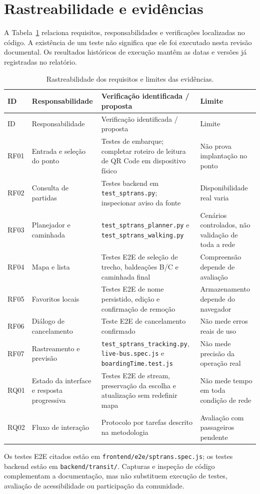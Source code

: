 \section{Rastreabilidade e evidências}
A Tabela~\ref{tab:rastreabilidade} relaciona requisitos, responsabilidades e verificações localizadas no código. A existência de um teste não significa que ele foi executado nesta revisão documental. Os resultados históricos de execução mantêm as datas e versões já registradas no relatório.
\begin{longtable}{p{1.2cm}p{3cm}p{5cm}p{3cm}}
\caption{Rastreabilidade dos requisitos e limites das evidências.}\label{tab:rastreabilidade}\\
\hline ID & Responsabilidade & Verificação identificada / proposta & Limite\\\hline\endfirsthead
\hline ID & Responsabilidade & Verificação identificada / proposta & Limite\\\hline\endhead
RF01 & Entrada e seleção do ponto & Testes de embarque; completar roteiro de leitura de QR Code em dispositivo físico & Não prova implantação no ponto\\
RF02 & Consulta de partidas & Testes backend em \nolinkurl{test_sptrans.py}; inspecionar aviso da fonte & Disponibilidade real varia\\
RF03 & Planejador e caminhada & \nolinkurl{test_sptrans_planner.py} e \nolinkurl{test_sptrans_walking.py} & Cenários controlados, não validação de toda a rede\\
RF04 & Mapa e lista & Testes E2E de seleção de trecho, baldeações B/C e caminhada final & Compreensão depende de avaliação\\
RF05 & Favoritos locais & Testes E2E de nome persistido, edição e confirmação de remoção & Armazenamento depende do navegador\\
RF06 & Diálogo de cancelamento & Teste E2E de cancelamento confirmado & Não mede erros reais de uso\\
RF07 & Rastreamento e previsão & \nolinkurl{test_sptrans_tracking.py}, \nolinkurl{live-bus.spec.js} e \nolinkurl{boardingTime.test.js} & Não mede precisão da operação real\\
RQ01 & Estado da interface e resposta progressiva & Testes E2E de stream, preservação da escolha e atualização sem redefinir mapa & Não mede tempo em toda condição de rede\\
RQ02 & Fluxo de interação & Protocolo por tarefas descrito na metodologia & Avaliação com passageiros pendente\\\hline
\end{longtable}
Os testes E2E citados estão em \nolinkurl{frontend/e2e/sptrans.spec.js}; os testes backend estão em \nolinkurl{backend/transit/}. Capturas e inspeção de código complementam a documentação, mas não substituem execução de testes, avaliação de acessibilidade ou participação da comunidade.

